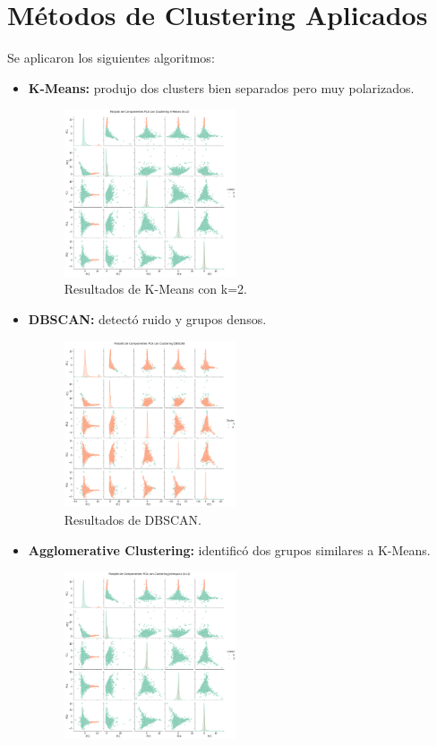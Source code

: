 \documentclass[conference]{IEEEtran}
\begin{document}
\section{Métodos de Clustering Aplicados}
Se aplicaron los siguientes algoritmos:

\begin{itemize}
    \item \textbf{K-Means:} produjo dos clusters bien separados pero muy polarizados.
        \begin{figure}[H]
            \centering
            \includegraphics[width=0.48\textwidth]{images/k_means.png}
            \caption{Resultados de K-Means con k=2.}
            \label{fig:kmeans}
        \end{figure}
    \item \textbf{DBSCAN:} detectó ruido y grupos densos.
        \begin{figure}[H]
            \centering
            \includegraphics[width=0.48\textwidth]{images/dbscan.png}
            \caption{Resultados de DBSCAN.}
            \label{fig:dbscan}
        \end{figure}
    \item \textbf{Agglomerative Clustering:} identificó dos grupos similares a K-Means.
        \begin{figure}[H]
            \centering
            \includegraphics[width=0.48\textwidth]{images/jerarquico.png}

\end{figure}
\end{itemize}
\end{document}
